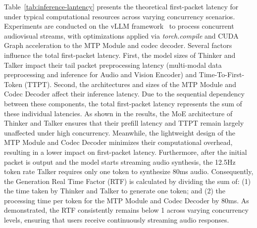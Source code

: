 Table~\ref{tab:inference-lantency} presents the theoretical first-packet latency for \method under typical computational resources across varying concurrency scenarios. Experiments are conducted on the vLLM framework~\citep{vllm} to process concurrent audiovisual streams, with optimizations applied via \textit{torch.compile} and CUDA Graph acceleration to the MTP Module and codec decoder. Several factors influence the total first-packet latency. First, the model sizes of Thinker and Talker impact their tail packet preprocessing latency (multi-modal data preprocessing and inference for Audio and Vision Encoder) and Time-To-First-Token (TTPT). Second, the architectures and sizes of the MTP Module and Codec Decoder affect their inference latency. Due to the sequential dependency between these components, the total first-packet latency represents the sum of these individual latencies. As shown in the results, the MoE architecture of Thinker and Talker ensures that their prefill latency and TTPT remain largely unaffected under high concurrency. Meanwhile, the lightweight design of the MTP Module and Codec Decoder minimizes their computational overhead, resulting in a lower impact on first-packet latency. Furthermore, after the initial packet is output and the model starts streaming audio synthesis, the 12.5Hz token rate Talker requires only one token to synthesize 80ms audio. Consequently, the Generation Real Time Factor (RTF) is calculated by dividing the sum of:  (1) the time taken by Thinker and Talker to generate one token; and (2) the processing time per token for the MTP Module and Codec Decoder by 80ms. As demonstrated, the RTF consistently remains below 1 across varying concurrency levels, ensuring that users receive continuously streaming audio responses.






